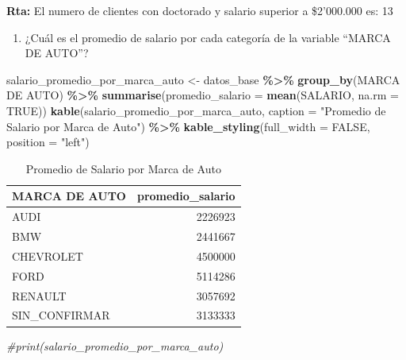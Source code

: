 \documentclass[
]{article}
\newenvironment{Shaded}{\begin{snugshade}}{\end{snugshade}}
\newcommand{\AttributeTok}[1]{\textcolor[rgb]{0.13,0.29,0.53}{#1}}
\newcommand{\CommentTok}[1]{\textcolor[rgb]{0.56,0.35,0.01}{\textit{#1}}}
\newcommand{\ConstantTok}[1]{\textcolor[rgb]{0.56,0.35,0.01}{#1}}
\newcommand{\FunctionTok}[1]{\textcolor[rgb]{0.13,0.29,0.53}{\textbf{#1}}}
\newcommand{\NormalTok}[1]{#1}
\newcommand{\OtherTok}[1]{\textcolor[rgb]{0.56,0.35,0.01}{#1}}
\newcommand{\SpecialCharTok}[1]{\textcolor[rgb]{0.81,0.36,0.00}{\textbf{#1}}}
\newcommand{\StringTok}[1]{\textcolor[rgb]{0.31,0.60,0.02}{#1}}
\providecommand{\tightlist}{%
  \setlength{\itemsep}{0pt}\setlength{\parskip}{0pt}}
\begin{document}
\textbf{Rta: } El numero de clientes con doctorado y salario superior a
\$2'000.000 es: 13

\begin{enumerate}
\def\labelenumi{\alph{enumi}.}
\setcounter{enumi}{3}
\tightlist
\item
  ¿Cuál es el promedio de salario por cada categoría de la variable
  ``MARCA DE AUTO''?
\end{enumerate}

\begin{Shaded}
\begin{Highlighting}[]
\NormalTok{salario\_promedio\_por\_marca\_auto }\OtherTok{\textless{}{-}}\NormalTok{ datos\_base }\SpecialCharTok{\%\textgreater{}\%}
  \FunctionTok{group\_by}\NormalTok{(}\StringTok{\textasciigrave{}}\AttributeTok{MARCA DE AUTO}\StringTok{\textasciigrave{}}\NormalTok{) }\SpecialCharTok{\%\textgreater{}\%}
  \FunctionTok{summarise}\NormalTok{(}\AttributeTok{promedio\_salario =} \FunctionTok{mean}\NormalTok{(SALARIO, }\AttributeTok{na.rm =} \ConstantTok{TRUE}\NormalTok{))}
\FunctionTok{kable}\NormalTok{(salario\_promedio\_por\_marca\_auto, }\AttributeTok{caption =} \StringTok{"Promedio de Salario por Marca de Auto"}\NormalTok{) }\SpecialCharTok{\%\textgreater{}\%}
  \FunctionTok{kable\_styling}\NormalTok{(}\AttributeTok{full\_width =} \ConstantTok{FALSE}\NormalTok{, }\AttributeTok{position =} \StringTok{"left"}\NormalTok{)}
\end{Highlighting}
\end{Shaded}

\begin{longtable}[l]{lr}
\caption{\label{tab:unnamed-chunk-17}Promedio de Salario por Marca de Auto}\\
\toprule
MARCA DE AUTO & promedio\_salario\\
\midrule
AUDI & 2226923\\
BMW & 2441667\\
CHEVROLET & 4500000\\
FORD & 5114286\\
RENAULT & 3057692\\
\addlinespace
SIN\_CONFIRMAR & 3133333\\
\bottomrule
\end{longtable}

\begin{Shaded}
\begin{Highlighting}[]
\CommentTok{\#print(salario\_promedio\_por\_marca\_auto)}
\end{Highlighting}
\end{Shaded}
\end{document}
